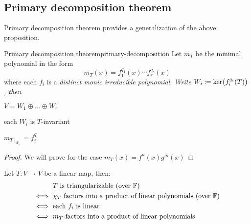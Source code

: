 \documentclass{styles/tufte}
\begin{document}
\subsection{Primary decomposition theorem}

  Primary decomposition theorem provides a generalization of the above proposition.
  
  \begin{theorem}{Primary decomposition theorem}{primary-decomposition}
    Let $m_T$ be the minimal polynomial in the form
    \[ m_T(x) = f_1^{q_1}(x) \cdots f_r^{q_r}(x) \]
    where each $f_i$ is a \em{distinct monic irreducible} polynomial. Write $W_i \defeq \ker\left(f_i^{q_i}(T)\right)$, then
    \begin{romanenum}
      \item $V = W_1 \oplus \dots \oplus W_r$
      \item each $W_i$ is $T$-invariant
      \item $m_{T\mid_{W_i}} = f_i^{q_i}$
    \end{romanenum}
  \end{theorem}
  \begin{proof}
    We will prove for the case $m_T(x) = f^n(x) g^m(x)$
  \end{proof}
  
  \begin{corollary}{}{}
    Let $T: V \to V$ be a linear map, then:
    \begin{align*}
      &\text{$T$ is triangularizable (over $\mathbb{F}$)} \\
      \iff\ &\text{$\chi_T$ factors into a product of linear polynomials (over $\mathbb{F}$)} \\
      \iff\ &\text{each $f_i$ is linear} \\
      \iff\ &\text{$m_T$ factors into a product of linear polynomials}
    \end{align*}
  \end{corollary}
  
\end{document}
